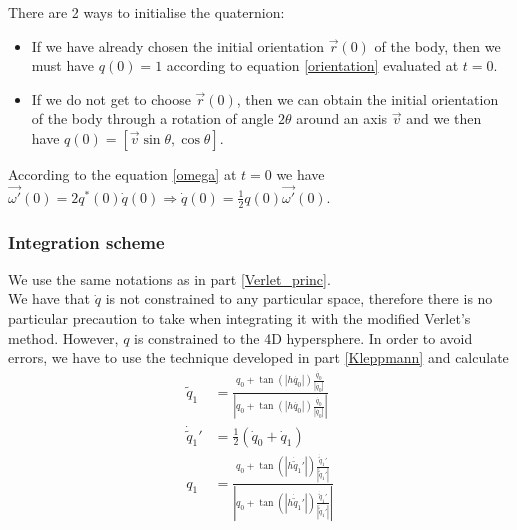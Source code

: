 \documentclass[class=report, float=false, crop=false]{standalone}
\begin{document}
There are 2 ways to initialise the quaternion:
\begin{itemize}
\item If we have already chosen the initial orientation $\vec{r}(0)$ of the body, then we must have $\boxed{q(0) = 1}$ according to equation \ref{orientation} evaluated at $t = 0$.
\item If we do not get to choose $\vec{r}(0)$, then we can obtain the initial orientation of the body through a rotation of angle $2\theta$ around an axis $\vec{v}$ and we then have $\boxed{q(0) = [\vec{v}\sin\theta,\cos\theta]}$.\\
\end{itemize}

According to the equation \ref{omega} at $t = 0$ we have $\vec{\omega'}(0) = 2q^*(0)\dot{q}(0) \Rightarrow \boxed{\dot{q}(0) = \frac{1}{2} q(0)\vec{\omega'}(0)}$.

\subsubsection{Integration scheme}

We use the same notations as in part \ref{Verlet_princ}.\\

We have that $\dot{q}$ is not constrained to any particular space, therefore there is no particular precaution to take when integrating it with the modified Verlet's method. However, $q$ is constrained to the 4D hypersphere. In order to avoid errors, we have to use the technique developed in part \ref{Kleppmann} and calculate
\begin{align*}
\tilde{q}_1 &= \frac{q_0 + \tan(|h\dot{q_0}|)\frac{\dot{q_0}}{|\dot{q_0}|}}{|q_0 + \tan(|h\dot{q_0}|)\frac{\dot{q_0}}{|\dot{q_0}|}|}\\
\dot{\tilde{q}}_1' &= \frac{1}{2}(\dot{q}_0 + \dot{q}_1)\\
q_1 &= \frac{q_0 + \tan(|h\dot{\tilde{q}}_1'|)\frac{\dot{\tilde{q}}_1'}{|\dot{\tilde{q}}_1'|}}{|q_0 + \tan(|h\dot{\tilde{q}}_1'|)\frac{\dot{\tilde{q}}_1'}{|\dot{\tilde{q}}_1'|}|}
\end{align*}
\end{document}
